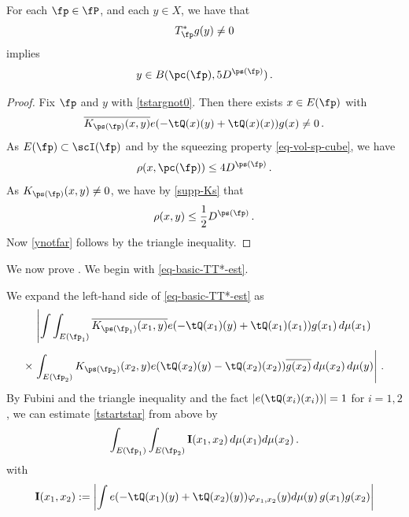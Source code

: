 \begin{lemma}\label{tile-range-support}
\leanok
{}
    For each $\fp\in \fP$, and each $y\in X$, we have that
\begin{equation}\label{tstargnot0}
     T_{\fp}^* g(y)\neq 0
\end{equation}
   implies
\begin{equation}\label{ynotfar}
    y\in B(\pc(\fp),5D^{\ps(\fp)})\, .
\end{equation}
\end{lemma}
\begin{proof}
Fix $\fp$ and $y$ with \eqref{tstargnot0}.
Then there exists $x\in E(\fp)$ with
\begin{equation}
   \overline{K_{\ps(\fp)}(x,y)}e(-\tQ(x)(y)
    +\tQ(x)(x))g(x) \neq 0\, .
\end{equation}
As $E(\fp)\subset \scI(\fp)$ and by the squeezing property
\eqref{eq-vol-sp-cube}, we have
\begin{equation}
    \rho(x,\pc(\fp))\le 4D^{\ps(\fp)}\, .
\end{equation}
As $K_{\ps(\fp)}(x,y)\neq 0$, we have by \eqref{supp-Ks}
that
\begin{equation}
\rho(x,y)\le \frac 12 D^{\ps(\fp)}\, .
\end{equation}
Now \eqref{ynotfar} follows by the triangle inequality.
\end{proof}


We now prove . We begin with \eqref{eq-basic-TT*-est}.

We expand the left-hand side of \eqref{eq-basic-TT*-est} as
\begin{equation}\label{tstartstar}
\left|\int \int_{E(\fp_1)} \overline{K_{\ps(\fp_1)}(x_1,y)}e(-\tQ(x_1)(y)+
    \tQ(x_1)(x_1))g(x_1)\, d\mu(x_1) \right.
\end{equation}
\begin{equation}
 \times \left.\int_{E(\fp_2)} {K_{\ps(\fp_2)}(x_2,y)}e(\tQ(x_2)(y)
    -\tQ(x_2)(x_2))\overline{g(x_2)}\, d\mu(x_2)\, d\mu(y)\right|\, .
\end{equation}
By Fubini and the triangle inequality and
the fact $|e(\tQ(x_i)(x_i))|=1$ for $i=1,2$, we can estimate
\eqref{tstartstar} from above by
\begin{equation}\label{eqa1}
    \int_{E(\fp_1)} \int_{E(\fp_2)} {\bf I}(x_1, x_2)\, d\mu(x_1)d\mu(x_2)\,.
\end{equation}
with
\begin{equation}
    {\bf I}(x_1, x_2):=
    \left|\int
    e(-\tQ(x_1)(y)+\tQ(x_2)(y))\varphi_{x_1,x_2}(y)
    d\mu(y) \, g(x_1)g(x_2)\right|
\end{equation}


